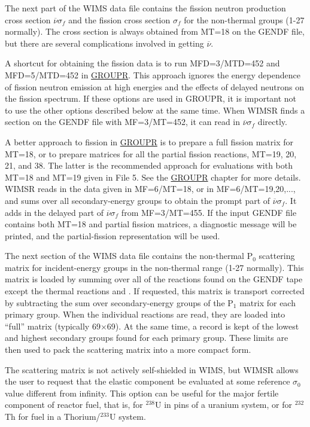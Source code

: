 The next part of the WIMS data file contains the fission neutron
production cross section $\overline{\nu}\sigma_f$ and the fission
cross section $\sigma_f$ for the non-thermal groups (1-27 normally).
The cross section is always obtained from MT=18 on the GENDF
file, but there are several complications involved in getting
$\overline{\nu}$.

A shortcut for obtaining the fission data is to run MFD=3/MTD=452
and MFD=5/MTD=452 in \hyperlink{sGROUPRhy}{GROUPR}.  This
approach ignores the energy dependence
of fission neutron emission at high energies and the effects of
delayed neutrons on the fission spectrum.  If these options are
used in GROUPR, it is important not to use the other options
described below at the same time.  When WIMSR finds a section on
the GENDF file with MF=3/MT=452, it can read in $\overline{\nu}\sigma_f$
directly.

A better approach to fission in \hyperlink{sGROUPRhy}{GROUPR}
is to prepare a full fission
matrix for MT=18, or to prepare matrices
for all the partial fission reactions, MT=19, 20, 21, and 38.
The latter is the recommended approach for evaluations with both
MT=18 and MT=19 given in File 5.  See the
\hyperlink{sGROUPRhy}{GROUPR} chapter for more
details.  WIMSR reads in the data given in MF=6/MT=18, or in
MF=6/MT=19,20,..., and sums over all secondary-energy groups
to obtain the prompt part of $\overline{\nu}\sigma_f$.  It adds
in the delayed part of $\overline{\nu}\sigma_f$ from MF=3/MT=455.
If the input GENDF file contains both MT=18 and partial fission matrices,
a diagnostic message will be printed, and the partial-fission
representation will be used.

The next section of the WIMS data file contains the non-thermal P$_0$
scattering matrix for incident-energy groups in the non-thermal range
(1-27 normally).  This matrix is loaded by summing over all of the
reactions found on the GENDF tape except the thermal reactions
 and .  If requested, this matrix is transport
corrected by subtracting the sum over secondary-energy groups of the
P$_1$ matrix for each primary group.  When the individual reactions
are read, they are loaded into ``full'' matrix (typically 69$\times$69).
At the same time, a record is kept of the lowest and highest secondary
groups found for each primary group.  These limits are then used to
pack the scattering matrix into a more compact form.

The scattering matrix is not actively self-shielded in WIMS, but WIMSR
allows the user to request that the elastic component be evaluated at
some reference $\sigma_0$ value different from infinity.  This option
can be useful for the major fertile component of reactor fuel, that is,
for $^{238}$U in pins of a uranium system, or for $^{232}$Th for fuel
in a Thorium/$^{233}$U system.

